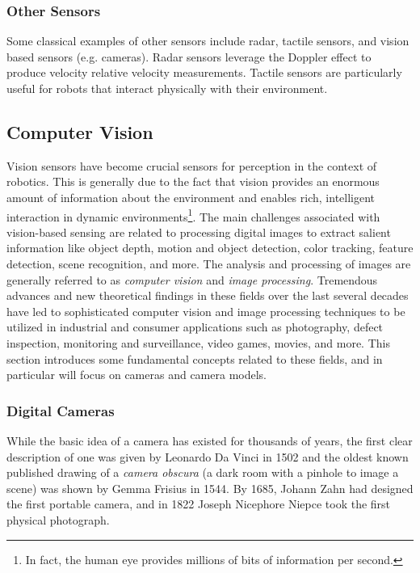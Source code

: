 \subsubsection{Other Sensors}
Some classical examples of other sensors include radar, tactile sensors, and vision based sensors (e.g. cameras). Radar sensors leverage the Doppler effect to produce velocity relative velocity measurements. Tactile sensors are particularly useful for robots that interact physically with their environment. 

\subsection{Computer Vision}
Vision sensors have become crucial sensors for perception in the context of robotics. This is generally due to the fact that vision provides an enormous amount of information about the environment and enables rich, intelligent interaction in dynamic environments\footnote{In fact, the human eye provides millions of bits of information per second.}. The main challenges associated with vision-based sensing are related to processing digital images to extract salient information like object depth, motion and object detection, color tracking, feature detection, scene recognition, and more.
The analysis and processing of images are generally referred to as \textit{computer vision} and \textit{image processing}. Tremendous advances and new theoretical findings in these fields over the last several decades have led to sophisticated computer vision and image processing techniques to be utilized in industrial and consumer applications such as photography, defect inspection, monitoring and surveillance, video games, movies, and more. 
This section introduces some fundamental concepts related to these fields, and in particular will focus on cameras and camera models.

\subsubsection{Digital Cameras}
While the basic idea of a camera has existed for thousands of years, the first clear description of one was given by Leonardo Da Vinci in 1502 and the oldest known published drawing of a \textit{camera obscura} (a dark room with a pinhole to image a scene) was shown by Gemma Frisius in 1544. By 1685, Johann Zahn had designed the first portable camera, and in 1822 Joseph Nicephore Niepce took the first physical photograph.

